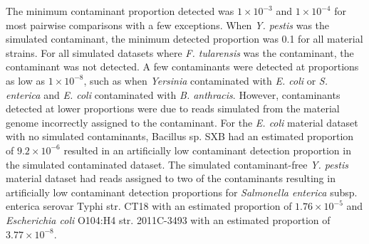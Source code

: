 \documentclass[fleqn,10pt,lineno]{wlpeerj}\usepackage[]{graphicx}\usepackage[]{color}
\begin{document}
The minimum contaminant proportion detected was $1 \times 10^{-3}$ and  $1 \times 10^{-4}$ for most pairwise comparisons with a few exceptions.
When \textit{Y. pestis} was the simulated contaminant, the minimum detected proportion was 0.1 for all material strains.
For all simulated datasets where \textit{F. tularensis} was the contaminant, the contaminant was not detected.
A few contaminants were detected at proportions as low as $1 \times 10^{-8}$, such as when \textit{Yersinia} contaminated with \textit{E. coli} or \textit{S. enterica} and \textit{E. coli} contaminated with \textit{B. anthracis}.
However, contaminants detected at lower proportions were due to reads simulated from the material genome incorrectly assigned to the contaminant.
For the \textit{E. coli} material dataset with no simulated contaminants, Bacillus sp. SXB had an estimated proportion of \ensuremath{9.2\times 10^{-6}} resulted in an artificially low contaminant detection proportion in the simulated contaminated dataset.
The simulated contaminant-free \textit{Y. pestis} material dataset had reads assigned to two of the contaminants resulting in artificially low contaminant detection proportions for \textit{Salmonella enterica} subsp. {enterica} serovar Typhi str. CT18 with an estimated proportion of \ensuremath{1.76\times 10^{-5}} and \textit{Escherichia coli} O104:H4 str. 2011C-3493 with an estimated proportion of \ensuremath{3.77\times 10^{-8}}.
\end{document}
